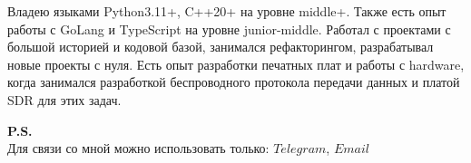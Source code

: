 

\begin{cvparagraph}


\begin{flushleft}
    Владею языками Python3.11+, C++20+ на уровне middle+.
    Также есть опыт работы с GoLang и TypeScript на уровне junior-middle.
    Работал с проектами с большой историей и кодовой базой, занимался рефакторингом, разрабатывал новые проекты с нуля.
    Есть опыт разработки печатных плат и работы с hardware, когда занимался разработкой беспроводного протокола передачи данных и платой SDR для этих задач.
\end{flushleft}
\begin{flushleft}
    \textbf{P.S.}\\
    Для связи со мной можно использовать только: $Telegram$, $Email$
\end{flushleft}
\end{cvparagraph}